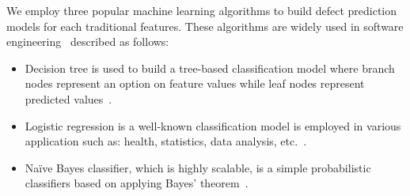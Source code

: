 We employ three popular machine learning algorithms to build defect prediction models for each traditional features. These algorithms are widely used in software engineering~\cite{wang2016automatically, jing2014dictionary} described as follows: 
\begin{itemize}
	\item Decision tree is used to build a tree-based classification model where branch nodes represent an option on feature values while leaf nodes represent predicted values~\cite{safavian1991survey}.
	\item Logistic regression is a well-known classification model is employed in various application such as: health, statistics, data analysis, etc.~\cite{hosmer2013applied}. 
	\item Na\"{i}ve Bayes classifier, which is highly scalable, is a simple probabilistic classifiers based on applying Bayes' theorem~\cite{vapnik1998statistical}. 
\end{itemize}

